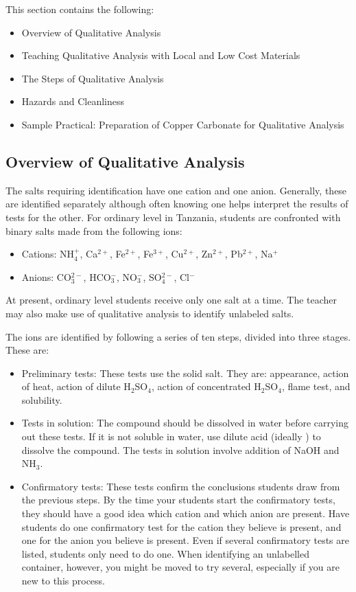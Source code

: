 This section contains the following:
\begin{itemize}
\item Overview of Qualitative Analysis
\item Teaching Qualitative Analysis with Local and Low Cost Materials
\item The Steps of Qualitative Analysis
\item Hazards and Cleanliness
\item Sample Practical: Preparation of Copper Carbonate for Qualitative Analysis
\end{itemize}


\subsection{Overview of Qualitative Analysis}

The salts requiring identification have one cation and one anion. Generally, these are identified separately although often knowing one helps interpret the results of tests for the other. For ordinary level in Tanzania, students are confronted with binary salts made from the following ions:

\begin{itemize}
\item{Cations: NH$_{4}^{+}$, 
Ca$^{2+}$, 
Fe$^{2+}$, 
Fe$^{3+}$, 
Cu$^{2+}$, 
Zn$^{2+}$, 
Pb$^{2+}$, 
Na$^{+}$}
\item{Anions: CO$_{3}^{2-}$, 
HCO$_{3}^{-}$, 
NO$_{3}^{-}$, 
SO$_{4}^{2-}$, 
Cl$^{-}$}
\end{itemize}
At present, 
ordinary level students receive only one salt at a time. The teacher may also make use of qualitative analysis to identify unlabeled salts.

The ions are identified by following a series of ten steps, divided into three stages. These are:
\begin{itemize}
\item{Preliminary tests:
These tests use the solid salt. They are: appearance, action of heat, action of dilute H$_{2}$SO$_{4}$, action of concentrated H$_{2}$SO$_{4}$, flame test, and solubility.}
\item{Tests in solution: The compound should be dissolved in water before carrying out these tests. If it is not soluble in water, use dilute acid (ideally ) to dissolve the compound. The tests in solution involve addition of NaOH and NH$_{3}$.}
\item{Confirmatory tests: These tests confirm the conclusions students draw from the previous steps. By the time your students start the confirmatory tests, they should have a good idea which cation and which anion are present. Have students do one confirmatory test for the cation they believe is present, and one for the anion you believe is present. Even if several confirmatory tests are listed, students only need to do one. When identifying an unlabelled container, however, you might be moved to try several, especially if you are new to this process.}
\end{itemize}

